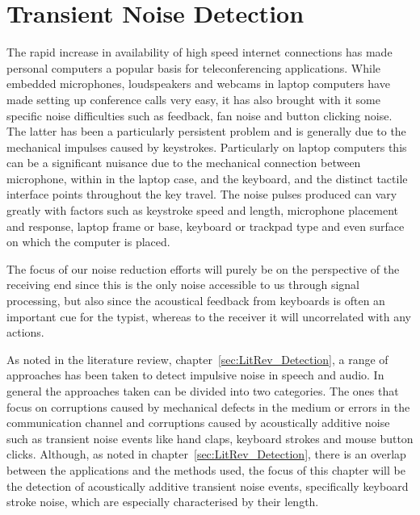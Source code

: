 \chapter{Transient Noise Detection}\label{ch:TransientNoiseDetection}

\ifpdf
    \graphicspath{{Chapter5_TransNoiseDet/Chapter5Figs/PNG/}{Chapter5_TransNoiseDet/Chapter5Figs/PDF/}{Chapter5_TransNoiseDet/Chapter5Figs/}{Chapter5_TransNoiseDet/Chapter5Figs/NoiseBurstModel/}{Chapter5_TransNoiseDet/Chapter5Figs/ARFilterMethod/}}
\else
    \graphicspath{{Chapter5_TransNoiseDet/Chapter5Figs/EPS/}{Chapter5_TransNoiseDet/Chapter5Figs/}}
\fi

The rapid increase in availability of high speed internet connections has made personal computers a popular basis for teleconferencing applications. While embedded microphones, loudspeakers and webcams in laptop computers have made setting up conference calls very easy, it has also brought with it some specific noise difficulties such as feedback, fan noise and button clicking noise. The latter has been a particularly persistent problem and is generally due to the mechanical impulses caused by keystrokes. Particularly on laptop computers this can be a significant nuisance due to the mechanical connection between microphone, within in the laptop case, and the keyboard, and the distinct tactile interface points throughout the key travel. The noise pulses produced can vary greatly with factors such as keystroke speed and length, microphone placement and response, laptop frame or base, keyboard or trackpad type and even surface on which the computer is placed.

The focus of our noise reduction efforts will purely be on the perspective of the receiving end since this is the only noise accessible to us through signal processing, but also since the acoustical feedback from keyboards is often an important cue for the typist, whereas to the receiver it will uncorrelated with any actions.

As noted in the literature review, chapter~\ref{sec:LitRev_Detection}, a range of approaches has been taken to detect impulsive noise in speech and audio. In general the approaches taken can be divided into two categories. The ones that focus on corruptions caused by mechanical defects in the medium or errors in the communication channel and corruptions caused by acoustically additive noise such as transient noise events like hand claps, keyboard strokes and mouse button clicks. Although, as noted in chapter~\ref{sec:LitRev_Detection}, there is an overlap between the applications and the methods used, the focus of this chapter will be the detection of acoustically additive transient noise events, specifically keyboard stroke noise, which are especially characterised by their length.


